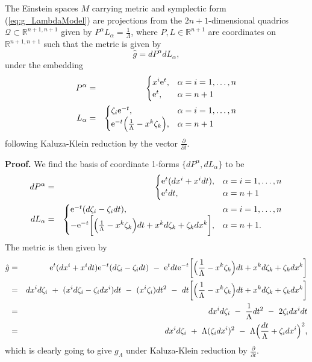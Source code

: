 \begin{prop}
The Einstein spaces $M$ carrying metric and symplectic form (\ref{eq:g_LambdaModel}) are projections from the $2n+1$-dimensional quadrics $\mathcal{Q}\subset\mathbb{R}^{n+1,n+1}$
given by $P^{\alpha}L_{\alpha}=\frac{1}{\Lambda}$, where $P,L\in\mathbb{R}^{n+1}$
are coordinates on $\mathbb{R}^{n+1,n+1}$ such that the metric is
given by 
\[
\hat{g}= dP^{\alpha} dL_{\alpha},
\]
 under the embedding
\begin{eqnarray}
P^{\alpha} & = & \begin{cases}
x^{i}\mathrm{e}^{t}, & \alpha=i=1,\dots,n\\
\mathrm{e}^{t}, & \alpha=n+1
\end{cases}\nonumber \\
L_{\alpha} & = & \begin{cases}
\zeta_{i}\mathrm{e}^{-t}, & \alpha=i=1,\dots,n\\
\mathrm{e}^{-t}\Bigl(\frac{1}{\Lambda}-x^{k}\zeta_{k}\Bigr), & \alpha=n+1
\end{cases}\label{eq:embedding-1}
\end{eqnarray}
following Kaluza-Klein reduction by the vector $\frac{\partial}{\partial t}.$
\end{prop}
\textbf{Proof. }We find the basis of coordinate 1-forms $\{ dP^{\alpha}, dL_{\alpha}\}$
to be
\begin{eqnarray*}
 dP^{\alpha} & = & \begin{cases}
\mathrm{e}^{t}( dx^{i}+x^{i} dt), & \alpha=i=1,\dots,n\\
\mathrm{e}^{t} dt, & \alpha=n+1
\end{cases}\\
 dL_{\alpha} & = & \begin{cases}
\mathrm{e}^{-t}( d\zeta_{i}-\zeta_{i} dt), & \alpha=i=1,\dots,n\\
-\mathrm{e}^{-t}\biggl[\Bigl(\frac{1}{\Lambda}-x^{k}\zeta_{k}\Bigr) dt+x^{k} d\zeta_{k}+\zeta_{k} dx^{k}\biggr], & \alpha=n+1.
\end{cases}
\end{eqnarray*}
The metric is then given by
\begin{eqnarray*}
\hat{g} & = & \mathrm{e}^{t}( dx^{i}+x^{i} dt)\mathrm{e}^{-t}( d\zeta_{i}-\zeta_{i} dt)\ -\ \mathrm{e}^{t} dt\mathrm{e}^{-t}\biggl[\Bigl(\frac{1}{\Lambda}-x^{k}\zeta_{k}\Bigr) dt+x^{k} d\zeta_{k}+\zeta_{k} dx^{k}\biggr]\\
 & = &  dx^{i} d\zeta_{i}\ +\ (x^{i} d\zeta_{i}-\zeta_{i} dx^{i}) dt\ -\ (x^{i}\zeta_{i}) dt^{2}\ -\  dt\biggl[\Bigl(\frac{1}{\Lambda}-x^{k}\zeta_{k}\Bigr) dt+x^{k} d\zeta_{k}+\zeta_{k} dx^{k}\biggr]\\
 & = &  dx^{i} d\zeta_{i}\ -\ \frac{1}{\Lambda} dt^{2}\ -\ 2\zeta_{i} dx^{i} dt\\
 & = &  dx^{i} d\zeta_{i}\ +\ \Lambda(\zeta_{i} dx^{i})^{2}\ -\ \Lambda\Bigl(\frac{ dt}{\Lambda}+\zeta_{i} dx^{i}\Bigr)^{2},
\end{eqnarray*}
which is clearly going to give $g_{\Lambda}$ under Kaluza-Klein reduction
by $\frac{\partial}{\partial t}$.
\koniec

